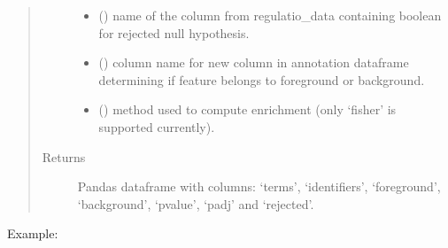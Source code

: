 \documentclass[letterpaper,10pt,english]{sphinxmanual}
\begin{document}
\begin{fulllineitems}
\begin{quote}
\begin{description}
\begin{itemize}
\item {} 
 () \textendash{} name of the column from regulatio\_data containing boolean for rejected null hypothesis.

\item {} 
 () \textendash{} column name for new column in annotation dataframe determining if feature belongs to foreground or background.

\item {} 
 () \textendash{} method used to compute enrichment (only ‘fisher’ is supported currently).

\end{itemize}

\item[{Returns}] \leavevmode
Pandas dataframe with columns: ‘terms’, ‘identifiers’, ‘foreground’, ‘background’, ‘pvalue’, ‘padj’ and ‘rejected’.

\end{description}\end{quote}

Example:

\begin{sphinxVerbatim}[commandchars=\\\{\}]
     \PYG{p}{[} \PYG{p}{]}    
\end{sphinxVerbatim}

\end{fulllineitems}
\end{document}
